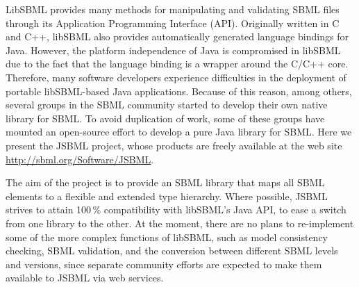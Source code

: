 \documentclass{bioinfo}
\begin{document}
LibSBML provides many methods for manipulating and validating
SBML files through its Application Programming Interface (API).
Originally written in C and C++, libSBML also provides automatically generated
language bindings for Java\texttrademark.
However, the platform independence of Java is compromised
in libSBML due to the fact that the language binding is a
wrapper around the C/C++ core.
Therefore, many software developers experience difficulties in
the deployment of portable libSBML-based Java applications.
Because of this reason, among others, several groups in the SBML community started
to develop their own native library for SBML. To avoid duplication of
work, some of these groups have mounted an open-source effort to
develop a pure Java library for SBML. Here we present the JSBML
project, whose products are freely available at the web site
\href{http://sbml.org/Software/JSBML}{http://sbml.org/Software/JSBML}.

The aim of the project is to provide an SBML
library that maps all SBML elements to a flexible and extended
type hierarchy. Where possible, JSBML strives to attain
100\,\% compatibility with libSBML's Java API, to ease a switch from
one library to the other. At the moment, there are no plans to re-implement some
of the more complex functions of libSBML, such as model consistency checking,
SBML validation, and the conversion between different SBML levels and versions,
since separate community efforts are expected to make them
available to JSBML via web services.

\end{document}
